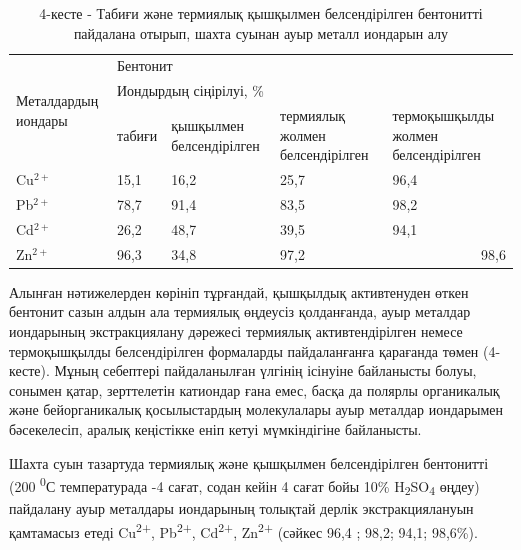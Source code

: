 \begin{table}[H]
\caption*{4-кесте - Табиғи және термиялық қышқылмен белсендірілген бентонитті пайдалана отырып, шахта суынан ауыр металл иондарын алу}
\centering
\begin{tabular}{|p{}|lllp{}|}
\hline
\multirow{3}{=}{Металдардың иондары} & \multicolumn{4}{l|}{Бентонит} \\ \cline{2-5}
 & \multicolumn{4}{l|}{Иондырдың сіңірілуі, \%} \\ \cline{2-5}
 & \multicolumn{1}{l|}{табиғи} & \multicolumn{1}{p{0.15\textwidth}|}{қышқылмен белсендірілген} & \multicolumn{1}{p{0.15\textwidth}|}{термиялық жолмен белсендірілген} & термоқышқылды жолмен белсендірілген \\ \hline
Cu$^{2+}$ & \multicolumn{1}{l|}{15,1} & \multicolumn{1}{l|}{16,2} & \multicolumn{1}{l|}{25,7} & 96,4 \\ \hline
Pb$^{2+}$ & \multicolumn{1}{l|}{78,7} & \multicolumn{1}{l|}{91,4} & \multicolumn{1}{l|}{83,5} & 98,2 \\ \hline
Cd$^{2+}$ & \multicolumn{1}{l|}{26,2} & \multicolumn{1}{l|}{48,7} & \multicolumn{1}{l|}{39,5} & 94,1 \\ \hline
Zn$^{2+}$ & \multicolumn{1}{l|}{96,3} & \multicolumn{1}{l|}{34,8} & \multicolumn{1}{l|}{97,2} & \multicolumn{1}{r|}{98,6} \\ \hline
\end{tabular}
\end{table}

\begin{multicols}{2}
Алынған нәтижелерден көрініп тұрғандай, қышқылдық активтенуден өткен
бентонит сазын алдын ала термиялық өңдеусіз қолданғанда, ауыр металдар
иондарының экстракциялану дәрежесі термиялық активтендірілген немесе
термоқышқылды белсендірілген формаларды пайдаланғанға қарағанда төмен
(4-кесте). Мұның себептері пайдаланылған үлгінің ісінуіне байланысты
болуы, сонымен қатар, зерттелетін катиондар ғана емес, басқа да полярлы
органикалық және бейорганикалық қосылыстардың молекулалары ауыр металдар
иондарымен бәсекелесіп, аралық кеңістікке еніп кетуі мүмкіндігіне
байланысты.

Шахта суын тазартуда термиялық және қышқылмен белсендірілген бентонитті
(200 \textsuperscript{0}С температурада -4 сағат, содан кейін 4 сағат
бойы 10\% H\textsubscript{2}SO\textsubscript{4} өңдеу) пайдалану ауыр
металдары иондарының толықтай дерлік экстракциялануын қамтамасыз етеді
Cu\textsuperscript{2+}, Pb\textsuperscript{2+}, Cd\textsuperscript{2+},
Zn\textsuperscript{2+} (сәйкес 96,4 ; 98,2; 94,1; 98,6\%).
\end{multicols}

